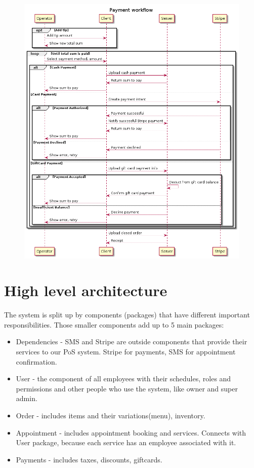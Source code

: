 \documentclass{article}
\begin{document}
    \begin{figure}[H]
        \centering
        \includegraphics[width=0.7\linewidth]{PSP/lab-1/diagrams/sequence/payment.png}
        \caption{}
        \label{}
    \end{figure}
    
    \section{High level architecture}
    The system is split up by components (packages) that have different important responsibilities. Those smaller components add up to 5 main packages:
    \begin{itemize}
        \item Dependencies - SMS and Stripe are outside components that provide their services to our PoS system. Stripe for payments, SMS for appointment confirmation.
        \item User - the component of all employees with their schedules, roles and permissions and other people who use the system, like owner and super admin.
        \item Order - includes items and their variations(menu), inventory.
        \item Appointment - includes appointment booking and services. Connects with User package, because each service has an employee associated with it.
        \item Payments - includes taxes, discounts, giftcards.
    \end{itemize}
    
\end{document}
